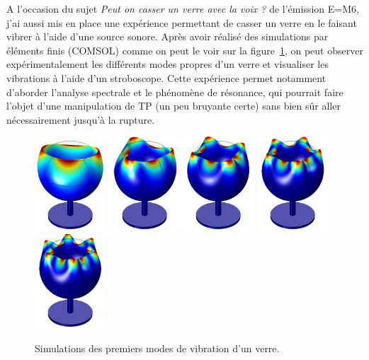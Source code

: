 \documentclass[12pt,a4paper]{article}
\begin{document}
A l'occasion du sujet \textit{Peut on casser un verre avec la voix ?} de l'émission E=M6, j'ai aussi mis en place une expérience permettant de casser un verre en le faisant vibrer à l'aide d'une source sonore.
Après avoir réalisé des simulations par éléments finis (COMSOL) comme on peut le voir sur la figure~\ref{fig:wine_glass}, on peut observer expérimentalement les différents modes propres d'un verre et visualiser les vibrations à l'aide d'un stroboscope.
Cette expérience permet notamment d'aborder l'analyse spectrale et le phénomène de résonance, qui pourrait faire l'objet d'une manipulation de TP (un peu bruyante certe) sans bien sûr aller nécessairement jusqu'à la rupture.

\begin{figure}
\center
\includegraphics[height=100pt]{figures/wine_glass_f0.png}
\includegraphics[height=100pt]{figures/wine_glass_f1.png}
\includegraphics[height=100pt]{figures/wine_glass_f2.png}
\includegraphics[height=100pt]{figures/wine_glass_f3.png}
\includegraphics[height=100pt]{figures/wine_glass_f4.png}
\caption{Simulations des premiers modes de vibration d'un verre.}
\label{fig:wine_glass}
\end{figure}
\end{document}
